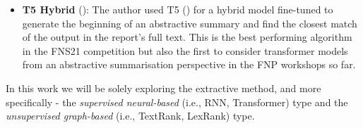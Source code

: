 \begin{itemize}
    \item \textbf{T5 Hybrid} (\cite{orzhenovskii-2021-t5}): The author used T5 (\cite{rayson2019t5}) for a hybrid model fine-tuned to generate the beginning of an abstractive summary and find the closest match of the output in the report’s full text.
    This is the best performing algorithm in the FNS21 competition but also the first to consider transformer models from an abstractive summarisation perspective in the FNP workshops so far.

\end{itemize}

In this work we will be solely exploring the extractive method, and more specifically - the \emph{supervised neural-based} (i.e., RNN, Transformer) type and the \emph{unsupervised graph-based} (i.e., TextRank, LexRank) type.

